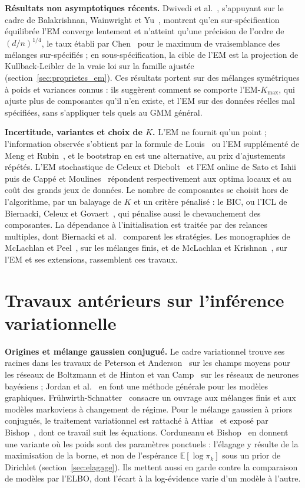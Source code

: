 \textbf{Résultats non asymptotiques récents. }Dwivedi et al.~\cite{dwivedi2020}, s'appuyant sur le cadre de Balakrishnan, Wainwright et Yu~\cite{balakrishnan2017}, montrent qu'en sur-spécification équilibrée l'EM converge lentement et n'atteint qu'une précision de l'ordre de $(d/n)^{1/4}$, le taux établi par Chen~\cite{chen1995} pour le maximum de vraisemblance des mélanges sur-spécifiés ; en sous-spécification, la cible de l'EM est la projection de Kullback-Leibler de la vraie loi sur la famille ajustée~\cite{dwivedi2018} (section~\ref{sec:proprietes_em}). Ces résultats portent sur des mélanges symétriques à poids et variances connus : ils suggèrent comment se comporte l'EM-$K_{\max}$, qui ajuste plus de composantes qu'il n'en existe, et l'EM sur des données réelles mal spécifiées, sans s'appliquer tels quels au GMM général.

\textbf{Incertitude, variantes et choix de $K$. }L'EM ne fournit qu'un point ; l'information observée s'obtient par la formule de Louis~\cite{louis1982} ou l'EM supplémenté de Meng et Rubin~\cite{meng1991}, et le bootstrap en est une alternative, au prix d'ajustements répétés. L'EM stochastique de Celeux et Diebolt~\cite{celeux1985} et l'EM online de Sato et Ishii~\cite{sato2000} puis de Cappé et Moulines~\cite{cappe2009} répondent respectivement aux optima locaux et au coût des grands jeux de données. Le nombre de composantes se choisit hors de l'algorithme, par un balayage de $K$ et un critère pénalisé : le BIC, ou l'ICL de Biernacki, Celeux et Govaert~\cite{biernacki2000}, qui pénalise aussi le chevauchement des composantes. La dépendance à l'initialisation est traitée par des relances multiples, dont Biernacki et al.~\cite{biernacki2003} comparent les stratégies. Les monographies de McLachlan et Peel~\cite{mclachlan2000}, sur les mélanges finis, et de McLachlan et Krishnan~\cite{mclachlan2008}, sur l'EM et ses extensions, rassemblent ces travaux.

\section{Travaux antérieurs sur l'inférence variationnelle}\label{sec:ea_vb}
\textbf{Origines et mélange gaussien conjugué. }Le cadre variationnel trouve ses racines dans les travaux de Peterson et Anderson~\cite{peterson1987} sur les champs moyens pour les réseaux de Boltzmann et de Hinton et van Camp~\cite{hinton1993} sur les réseaux de neurones bayésiens ; Jordan et al.~\cite{jordan1999} en font une méthode générale pour les modèles graphiques. Frühwirth-Schnatter~\cite{fruhwirth2006} consacre un ouvrage aux mélanges finis et aux modèles markoviens à changement de régime. Pour le mélange gaussien à priors conjugués, le traitement variationnel est rattaché à Attias~\cite{attias2000} et exposé par Bishop~\cite[section~10.2]{bishop2006}, dont ce travail suit les équations. Corduneanu et Bishop~\cite{corduneanu2001} en donnent une variante où les poids sont des paramètres ponctuels : l'élagage y résulte de la maximisation de la borne, et non de l'espérance $\mathbb{E}[\log \pi_k]$ sous un prior de Dirichlet (section~\ref{sec:elagage}). Ils mettent aussi en garde contre la comparaison de modèles par l'ELBO, dont l'écart à la log-évidence varie d'un modèle à l'autre.

